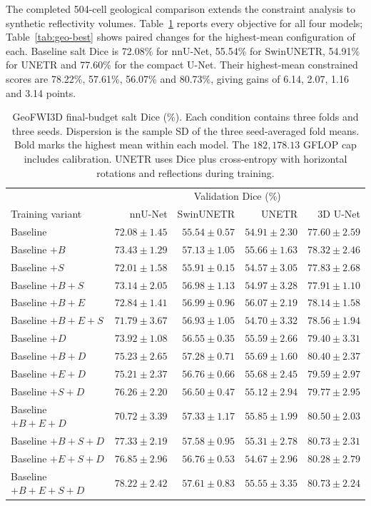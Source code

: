 \documentclass[12pt,a4paper]{article}
\begin{document}
The completed 504-cell geological comparison extends the constraint
analysis to synthetic reflectivity volumes. Table~\ref{tab:geo-matrix}
reports every objective for all four models; Table~\ref{tab:geo-best}
shows paired changes for the highest-mean configuration of each.
Baseline salt Dice is 72.08\% for nnU-Net, 55.54\% for SwinUNETR,
54.91\% for UNETR and 77.60\% for the compact U-Net. Their
highest-mean constrained scores are 78.22\%, 57.61\%, 56.07\% and
80.73\%, giving gains of 6.14, 2.07, 1.16 and 3.14 points.

\begin{table}[htbp]
\centering\small{}
\setlength{\tabcolsep}{5pt}
\renewcommand{\arraystretch}{1.15}
\begin{tabular}{@{}lrrrr@{}}
\hline
 & \multicolumn{4}{c}{Validation Dice (\%)} \\
Training variant & nnU-Net & SwinUNETR & UNETR & 3D U-Net \\
\hline
Baseline & $72.08\pm1.45$ & $55.54\pm0.57$ & $54.91\pm2.30$ & $77.60\pm2.59$ \\
Baseline $+B$ & $73.43\pm1.29$ & $57.13\pm1.05$ & $55.66\pm1.63$ & $78.32\pm2.46$ \\
Baseline $+S$ & $72.01\pm1.58$ & $55.91\pm0.15$ & $54.57\pm3.05$ & $77.83\pm2.68$ \\
Baseline $+B+S$ & $73.14\pm2.05$ & $56.98\pm1.13$ & $54.97\pm3.28$ & $77.91\pm1.10$ \\
Baseline $+B+E$ & $72.84\pm1.41$ & $56.99\pm0.96$ & $\mathbf{56.07\pm2.19}$ & $78.14\pm1.58$ \\
Baseline $+B+E+S$ & $71.79\pm3.67$ & $56.93\pm1.05$ & $54.70\pm3.32$ & $78.56\pm1.94$ \\
Baseline $+D$ & $73.92\pm1.08$ & $56.55\pm0.35$ & $55.59\pm2.66$ & $79.40\pm3.31$ \\
Baseline $+B+D$ & $75.23\pm2.65$ & $57.28\pm0.71$ & $55.69\pm1.60$ & $80.40\pm2.37$ \\
Baseline $+E+D$ & $75.21\pm2.37$ & $56.76\pm0.66$ & $55.68\pm2.45$ & $79.59\pm2.97$ \\
Baseline $+S+D$ & $76.26\pm2.20$ & $56.50\pm0.47$ & $55.12\pm2.94$ & $79.77\pm2.95$ \\
Baseline $+B+E+D$ & $70.72\pm3.39$ & $57.33\pm1.17$ & $55.85\pm1.99$ & $80.50\pm2.03$ \\
Baseline $+B+S+D$ & $77.33\pm2.19$ & $57.58\pm0.95$ & $55.31\pm2.78$ & $80.73\pm2.31$ \\
Baseline $+E+S+D$ & $76.85\pm2.96$ & $56.76\pm0.53$ & $54.67\pm2.96$ & $80.28\pm2.79$ \\
Baseline $+B+E+S+D$ & $\mathbf{78.22\pm2.42}$ & $\mathbf{57.61\pm0.83}$ & $55.55\pm3.35$ & $\mathbf{80.73\pm2.24}$ \\
\hline
\end{tabular}
\caption{GeoFWI3D final-budget salt Dice (\%). Each condition contains
three folds and three seeds. Dispersion is the sample SD of the three
seed-averaged fold means. Bold marks the highest mean within each model.
The $182{,}178.13$ GFLOP cap includes calibration. UNETR uses
Dice plus cross-entropy with horizontal rotations and reflections during
training.}
\label{tab:geo-matrix}
\end{table}
\end{document}
